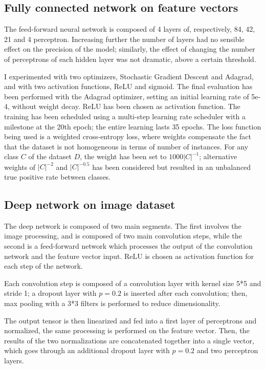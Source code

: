 \documentclass[10pt,a4paper,twocolumn]{article}
\begin{document}
\subsection{Fully connected network on feature vectors}

The feed-forward neural network is composed of 4 layers of, respectively, 84, 42, 21 and 4 perceptron.
Increasing further the number of layers had no sensible effect on the precision of the model; similarly, the effect of changing the number of perceptrons of each hidden layer was not dramatic, above a certain threshold.

I experimented with two optimizers, Stochastic Gradient Descent and Adagrad, and with two activation functions, ReLU and sigmoid. The final evaluation has been performed with the Adagrad optimizer, setting an initial learning rate of 5e-4, without weight decay. ReLU has been chosen as activation function. The training has been scheduled using a multi-step learning rate scheduler with a milestone at the 20th epoch; the entire learning lasts 35 epochs. The loss function being used is a weighted cross-entropy loss, where weights compensate the fact that the dataset is not homogeneous in terms of number of instances. For any class $C$ of the dataset $D$, the weight has been set to $1000{|C|}^{-1}$; alternative weights of ${|C|}^{-2}$ and $|C|^{-0.5}$ has been considered but resulted in an unbalanced true positive rate between classes.

\subsection{Deep network on image dataset}

The deep network is composed of two main segments. The first involves the image processing, and is composed of two main convolution steps, while the second is a feed-forward network which processes the output of the convolution network and the feature vector input. ReLU is chosen as activation function for each step of the network.

Each convolution step is composed of a convolution layer with kernel size 5*5 and stride 1; a dropout layer with $p = 0.2$ is inserted after each convolution; then, max pooling with a 3*3 filters is performed to reduce dimensionality.

The output tensor is then linearized and fed into a first layer of perceptrons and normalized, the same processing is performed on the feature vector. Then, the results of the two normalizations are concatenated together into a single vector, which goes through an additional dropout layer with $p = 0.2$ and two perceptron layers.  
\end{document}
